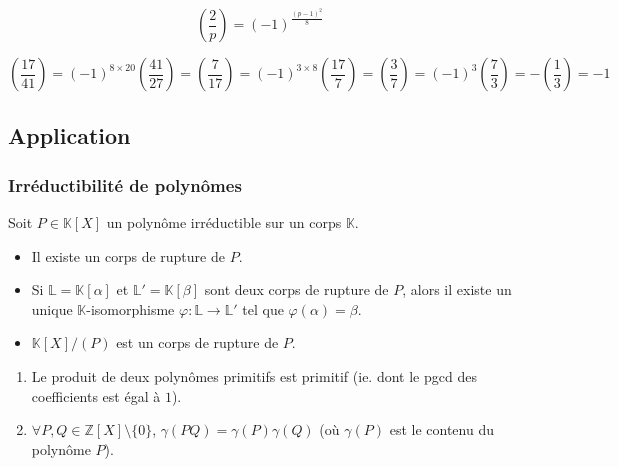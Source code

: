 	\begin{proposition}
		\[ \left( \frac{2}{p} \right) = (-1)^{\frac{(p-1)^2}{8}} \]
	\end{proposition}

	\begin{example}
		\[ \left( \frac{17}{41} \right) = (-1)^{8 \times 20} \left( \frac{41}{27} \right) = \left( \frac{7}{17} \right) = (-1)^{3 \times 8} \left( \frac{17}{7} \right) = \left( \frac{3}{7} \right) = (-1)^{3} \left( \frac{7}{3} \right) = - \left( \frac{1}{3} \right) = -1 \]
	\end{example}

	\subsection{Application}

	\subsubsection{Irréductibilité de polynômes}


	\begin{theorem}
		Soit $P \in \mathbb{K}[X]$ un polynôme irréductible sur un corps $\mathbb{K}$.
		\begin{itemize}
			\item Il existe un corps de rupture de $P$.
			\item Si $\mathbb{L} = \mathbb{K}[\alpha]$ et $\mathbb{L}' = \mathbb{K}[\beta]$ sont deux corps de rupture de $P$, alors il existe un unique $\mathbb{K}$-isomorphisme $\varphi : \mathbb{L} \rightarrow \mathbb{L}'$ tel que $\varphi(\alpha) = \beta$.
			\item $\mathbb{K}[X]/(P)$ est un corps de rupture de $P$.
		\end{itemize}
	\end{theorem}


	\begin{lemma}[Gauss]
		\begin{enumerate}[label=(\roman*)]
			\item Le produit de deux polynômes primitifs est primitif (ie. dont le pgcd des coefficients est égal à $1$).
			\item $\forall P, Q \in \mathbb{Z}[X] \setminus \{ 0 \}$, $\gamma(PQ) = \gamma(P) \gamma(Q)$ (où $\gamma(P)$ est le contenu du polynôme $P$).
		\end{enumerate}
	\end{lemma}

